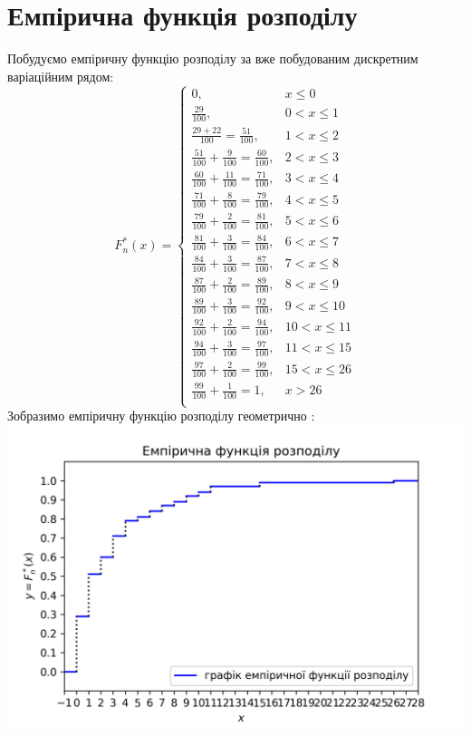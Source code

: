\documentclass{article}
\begin{document}
\section{Емпірична функція розподілу}
Побудуємо емпіричну функцію розподілу за вже побудованим 
дискретним варіаційним рядом:
\newline
\begin{equation}
  F_n^*(x) = \begin{cases}
    0,  & x \leq 0 \\
    \frac{29}{100}, & 0 < x \leq 1 \\
    \frac{29 + 22}{100} = \frac{51}{100}, & 1 < x \leq 2 \\
    \frac{51}{100} + \frac{9}{100} = \frac{60}{100}, & 2 < x \leq 3 \\
    \frac{60}{100} + \frac{11}{100} = \frac{71}{100}, & 3 < x \leq 4 \\
    \frac{71}{100} + \frac{8}{100} = \frac{79}{100}, & 4 < x \leq 5 \\
    \frac{79}{100} + \frac{2}{100} = \frac{81}{100}, & 5 < x \leq 6 \\
    \frac{81}{100} + \frac{3}{100} = \frac{84}{100}, & 6 < x \leq 7 \\
    \frac{84}{100} + \frac{3}{100} = \frac{87}{100}, & 7 < x \leq 8 \\
    \frac{87}{100} + \frac{2}{100} = \frac{89}{100}, & 8 < x \leq 9 \\
    \frac{89}{100} + \frac{3}{100} = \frac{92}{100}, & 9 < x \leq 10 \\
    \frac{92}{100} + \frac{2}{100} = \frac{94}{100}, & 10 < x \leq 11 \\
    \frac{94}{100} + \frac{3}{100} = \frac{97}{100}, & 11 < x \leq 15 \\
    \frac{97}{100} + \frac{2}{100} = \frac{99}{100}, & 15 < x \leq 26 \\
    \frac{99}{100} + \frac{1}{100} = 1, & x > 26 \\
  \end{cases}
\end{equation}
\newpage
Зобразимо емпіричну функцію розподілу геометрично :
\newline
\includegraphics[scale = 0.8]{func}
\end{document}
